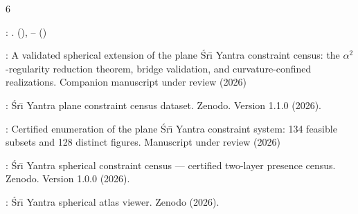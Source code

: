 \documentclass[pdflatex,sn-mathphys-num]{sn-jnl}
\begin{document}
\begin{thebibliography}{6}
\begin{barticle}
:
.
(),
--
()
\end{barticle}
\endbibitem

\begin{botherref}
:
A validated spherical extension of the plane {\'S}r{\={\i}} {Yantra} constraint
  census: the $\alpha^2$-regularity reduction theorem, bridge validation, and
  curvature-confined realizations.
Companion manuscript under review
(2026)
\end{botherref}
\endbibitem

\begin{botherref}
:
{\'S}r{\={\i}} {Yantra} plane constraint census dataset.
Zenodo.
Version 1.1.0
(2026).
\end{botherref}
\endbibitem

\begin{botherref}
:
Certified enumeration of the plane {\'S}r{\={\i}} {Yantra} constraint system:
  134 feasible subsets and 128 distinct figures.
Manuscript under review
(2026)
\end{botherref}
\endbibitem

\begin{botherref}
:
{\'S}r{\={\i}} {Yantra} spherical constraint census --- certified two-layer
  presence census.
Zenodo.
Version 1.0.0
(2026).
\end{botherref}
\endbibitem

\begin{botherref}
:
{\'S}r{\={\i}} {Yantra} spherical atlas viewer.
Zenodo
(2026).
\end{botherref}
\endbibitem

\end{thebibliography}
\end{document}

